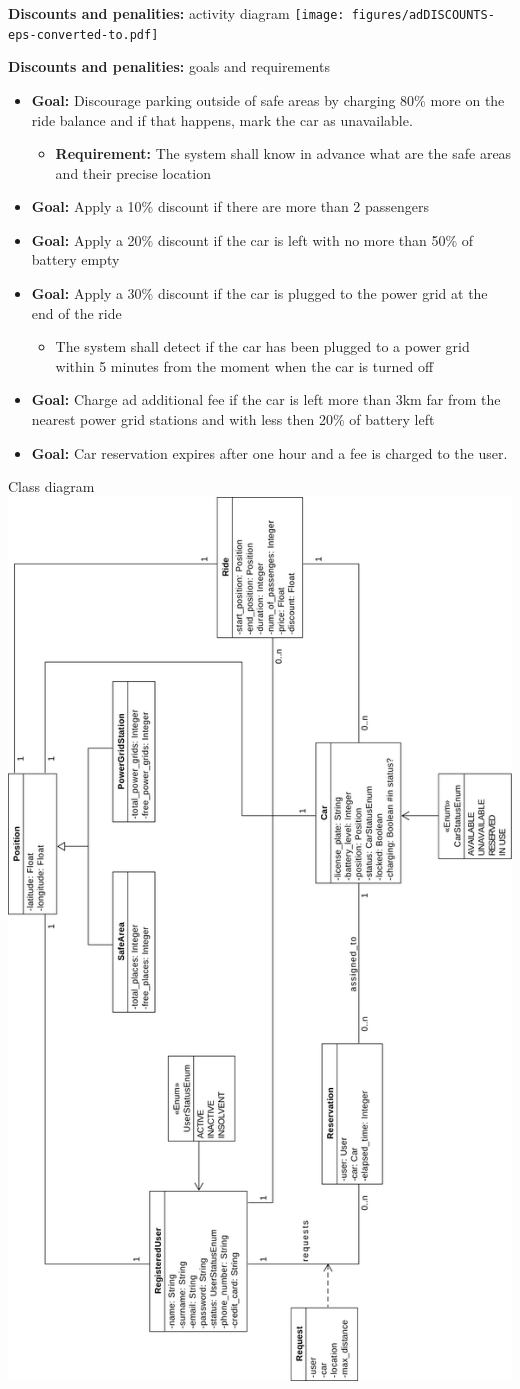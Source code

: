 \documentclass{beamer}
\begin{document}
	\begin{frame}{\textbf{Discounts and penalities:} activity diagram }
		\texttt{[image: figures/adDISCOUNTS-eps-converted-to.pdf]}
	\end{frame}

	\begin{frame}{\textbf{Discounts and penalities:} goals and requirements}
			\begin{itemize}
				\item \textbf{Goal:} Discourage parking outside of safe areas by charging 80\% more on the ride balance and if that happens, mark the car as unavailable.
				\begin{itemize}
					\item \textbf{Requirement: } The system shall know in advance what are the safe areas and their precise location
				\end{itemize}
				\item \textbf{Goal:} Apply a 10\% discount if there are more than 2 passengers
				\item \textbf{Goal:} Apply a 20\% discount if the car is left with no more than 50\% of battery empty
				\item \textbf{Goal: } Apply a 30\% discount if the car is plugged to the power grid at the end of the ride
				\begin{itemize}
					\item The system shall detect if the car has been plugged to a power grid within 5 minutes from the moment when the car is turned off
				\end{itemize}
				\item \textbf{Goal:} Charge ad additional fee if the car is left more than 3km far from the nearest power grid stations and with less then 20\% of battery left
				\item \textbf{Goal: } Car reservation expires after one hour and a fee is charged to the user.
			\end{itemize}		
	\end{frame}

	\begin{frame}{Class diagram}
		\includegraphics[height=\textwidth, angle=270]{figures/classdiagram.pdf}		
	\end{frame}
\end{document}
